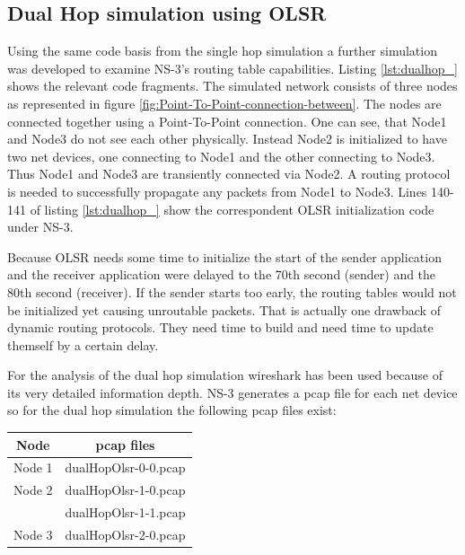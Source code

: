 \subsection{Dual Hop simulation using OLSR}

Using the same code basis from the single hop simulation a further
simulation was developed to examine NS-3's routing table capabilities.
Listing \ref{lst:dualhop_} shows the relevant code fragments. The
simulated network consists of three nodes as represented in figure
\ref{fig:Point-To-Point-connection-between}. The nodes are connected
together using a Point-To-Point connection. One can see, that Node1
and Node3 do not see each other physically. Instead Node2 is initialized
to have two net devices, one connecting to Node1 and the other connecting
to Node3. Thus Node1 and Node3 are transiently connected via Node2.
A routing protocol is needed to successfully propagate any packets
from Node1 to Node3. Lines 140-141 of listing \ref{lst:dualhop_}
show the correspondent OLSR initialization code under NS-3.

Because OLSR needs some time to initialize the start of the sender
application and the receiver application were delayed to the 70th
second (sender) and the 80th second (receiver). If the sender starts
too early, the routing tables would not be initialized yet causing
unroutable packets. That is actually one drawback of dynamic routing
protocols. They need time to build and need time to update themself
by a certain delay.

\texttt{\small }{\small \par}

For the analysis of the dual hop simulation wireshark has been used
because of its very detailed information depth. NS-3 generates a pcap
file for each net device so for the dual hop simulation the following
pcap files exist:

\begin{center}
\begin{tabular}{|c|c|}
\hline 
Node & pcap files\tabularnewline
\hline
\hline 
Node 1 & \multicolumn{1}{c|}{dualHopOlsr-0-0.pcap}\tabularnewline
\hline 
Node 2 & dualHopOlsr-1-0.pcap\tabularnewline
 & dualHopOlsr-1-1.pcap\tabularnewline
\hline 
Node 3 & dualHopOlsr-2-0.pcap\tabularnewline
\hline
\end{tabular}
\par\end{center}

